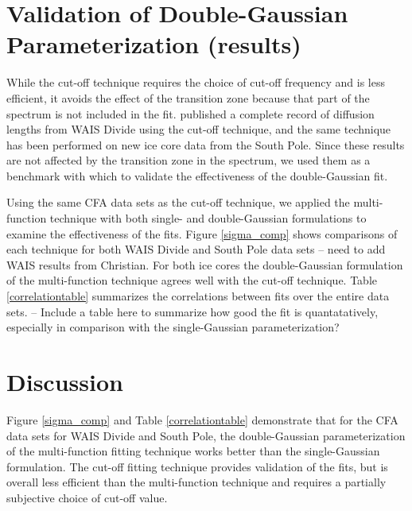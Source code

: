 \documentclass[draft, jgrga]{AGUTeX}
\begin{document}
\begin{article}


\section{Validation of Double-Gaussian Parameterization (results)}

While the cut-off technique requires the choice of cut-off frequency and is less efficient, it avoids the effect of the transition zone because that part of the spectrum is not included in the fit. \citet{Jones2016} published a complete record of diffusion lengths from WAIS Divide using the cut-off technique, and the same technique has been performed on new ice core data from the South Pole. Since these results are not affected by the transition zone in the spectrum, we used them as a benchmark with which to validate the effectiveness of the double-Gaussian fit.

Using the same CFA data sets as the cut-off technique, we applied the multi-function technique with both single- and double-Gaussian formulations to examine the effectiveness of the fits. Figure \ref{sigma_comp} shows comparisons of each technique for both WAIS Divide and South Pole data sets -- need to add WAIS results from Christian. For both ice cores the double-Gaussian formulation of the multi-function technique agrees well with the cut-off technique. Table \ref{correlationtable} summarizes the correlations between fits over the entire data sets. -- Include a table here to summarize how good the fit is quantatatively, especially in comparison with the single-Gaussian parameterization?




\section{Discussion}

Figure \ref{sigma_comp} and Table \ref{correlationtable} demonstrate that for the CFA data sets for WAIS Divide and South Pole, the double-Gaussian parameterization of the multi-function fitting technique works better than the single-Gaussian formulation. The cut-off fitting technique provides validation of the fits, but is overall less efficient than the multi-function technique and requires a partially subjective choice of cut-off value.


\end{article}
\end{document}
